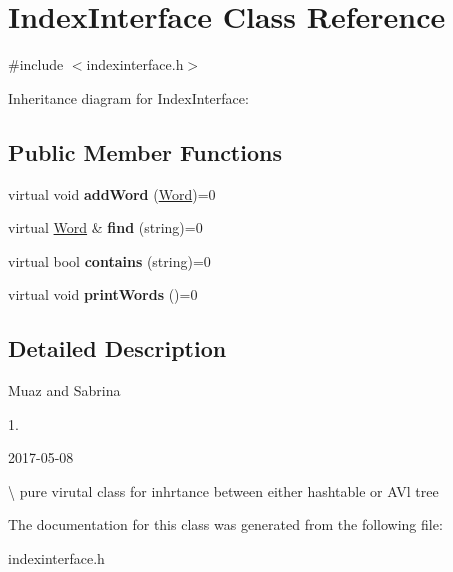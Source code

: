\hypertarget{classIndexInterface}{}\section{Index\+Interface Class Reference}
\label{classIndexInterface}


{\ttfamily \#include $<$indexinterface.\+h$>$}



Inheritance diagram for Index\+Interface\+:
\subsection*{Public Member Functions}
\begin{DoxyCompactItemize}
\item 
virtual void {\bfseries add\+Word} (\hyperlink{classWord}{Word})=0\hypertarget{classIndexInterface_ac785dd756b5c5ab4cd3c7f2e70f454f6}{}\label{classIndexInterface_ac785dd756b5c5ab4cd3c7f2e70f454f6}

\item 
virtual \hyperlink{classWord}{Word} \& {\bfseries find} (string)=0\hypertarget{classIndexInterface_a299cd83aa22ffc43e05e38ff44205048}{}\label{classIndexInterface_a299cd83aa22ffc43e05e38ff44205048}

\item 
virtual bool {\bfseries contains} (string)=0\hypertarget{classIndexInterface_ae71e9970659757b2b1741dfcc62f3939}{}\label{classIndexInterface_ae71e9970659757b2b1741dfcc62f3939}

\item 
virtual void {\bfseries print\+Words} ()=0\hypertarget{classIndexInterface_a9fb0a99c749fb3890452188074340b2b}{}\label{classIndexInterface_a9fb0a99c749fb3890452188074340b2b}

\end{DoxyCompactItemize}


\subsection{Detailed Description}
Muaz and Sabrina

1.

2017-\/05-\/08

\textbackslash{} pure virutal class for inhrtance between either hashtable or A\+Vl tree 

The documentation for this class was generated from the following file\+:\begin{DoxyCompactItemize}
\item 
indexinterface.\+h\end{DoxyCompactItemize}
